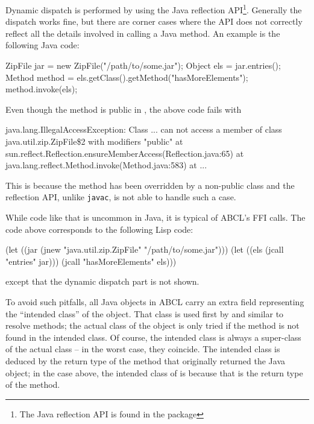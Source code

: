 \documentclass[10pt]{book}
\begin{document}
Dynamic dispatch is performed by using the Java reflection
API\footnote{The Java reflection API is found in the
   package}. Generally the dispatch works
fine, but there are corner cases where the API does not correctly
reflect all the details involved in calling a Java method. An example
is the following Java code:

\begin{listing-java}
ZipFile jar = new ZipFile("/path/to/some.jar");
Object els = jar.entries();
Method method = els.getClass().getMethod("hasMoreElements");
method.invoke(els);
\end{listing-java}

Even though the method  is public in
, the above code fails with

\begin{listing-java}
java.lang.IllegalAccessException: Class ... can
not access a member of class java.util.zip.ZipFile\$2 with modifiers
"public"
       at sun.reflect.Reflection.ensureMemberAccess(Reflection.java:65)
       at java.lang.reflect.Method.invoke(Method.java:583)
       at ...
\end{listing-java}

This is because the method has been overridden by a non-public class and
the reflection API, unlike \texttt{javac}, is not able to handle such a case.

While code like that is uncommon in Java, it is typical of ABCL's FFI
calls. The code above corresponds to the following Lisp code:

\begin{listing-lisp}
(let ((jar (jnew "java.util.zip.ZipFile" "/path/to/some.jar")))
  (let ((els (jcall "entries" jar)))
    (jcall "hasMoreElements" els)))
\end{listing-lisp}

except that the dynamic dispatch part is not shown.

To avoid such pitfalls, all Java objects in \textsc{ABCL} carry an extra
field representing the ``intended class'' of the object. That class is
used first by  and similar to resolve methods; the
actual class of the object is only tried if the method is not found in
the intended class. Of course, the intended class is always a
super-class of the actual class -- in the worst case, they coincide. The
intended class is deduced by the return type of the method that
originally returned the Java object; in the case above, the intended
class of  is  because that is the
return type of the  method.
\end{document}
